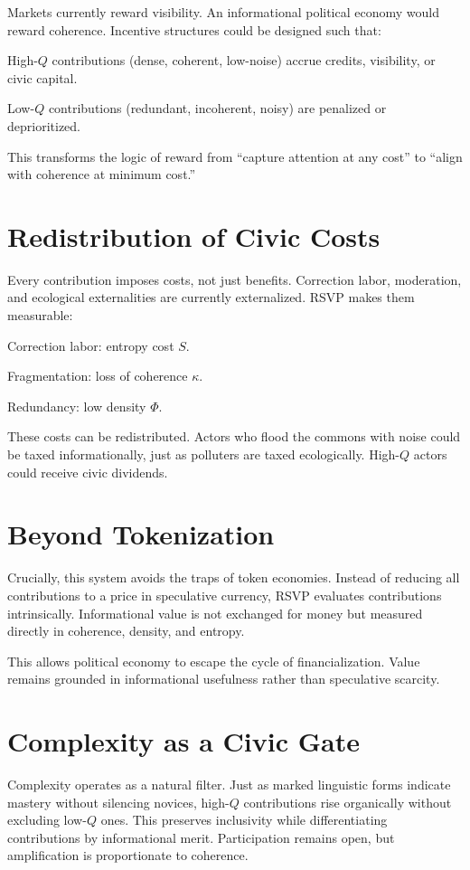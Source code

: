 \documentclass{book}
\begin{document}
Markets currently reward visibility. An informational political economy would reward coherence. Incentive structures could be designed such that:

High-\( Q \) contributions (dense, coherent, low-noise) accrue credits, visibility, or civic capital.

Low-\( Q \) contributions (redundant, incoherent, noisy) are penalized or deprioritized.

This transforms the logic of reward from “capture attention at any cost” to “align with coherence at minimum cost.”

\section{Redistribution of Civic Costs}

Every contribution imposes costs, not just benefits. Correction labor, moderation, and ecological externalities are currently externalized. RSVP makes them measurable:

Correction labor: entropy cost \( S \).

Fragmentation: loss of coherence \( \kappa \).

Redundancy: low density \( \Phi \).

These costs can be redistributed. Actors who flood the commons with noise could be taxed informationally, just as polluters are taxed ecologically. High-\( Q \) actors could receive civic dividends.

\section{Beyond Tokenization}

Crucially, this system avoids the traps of token economies. Instead of reducing all contributions to a price in speculative currency, RSVP evaluates contributions intrinsically. Informational value is not exchanged for money but measured directly in coherence, density, and entropy.

This allows political economy to escape the cycle of financialization. Value remains grounded in informational usefulness rather than speculative scarcity.

\section{Complexity as a Civic Gate}

Complexity operates as a natural filter. Just as marked linguistic forms indicate mastery without silencing novices, high-\( Q \) contributions rise organically without excluding low-\( Q \) ones. This preserves inclusivity while differentiating contributions by informational merit. Participation remains open, but amplification is proportionate to coherence.
\end{document}
